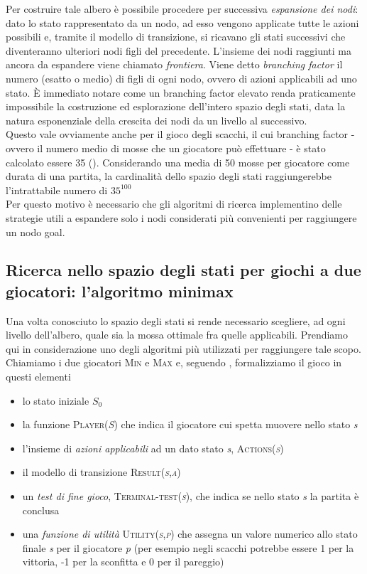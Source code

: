 Per costruire tale albero è possibile procedere per successiva \emph{espansione dei nodi}: dato lo stato rappresentato da un nodo, ad esso vengono applicate tutte le azioni possibili e, tramite il modello di transizione, si ricavano gli stati successivi che diventeranno ulteriori nodi figli del precedente.
L'insieme dei nodi raggiunti ma ancora da espandere viene chiamato \emph{frontiera}.
Viene detto \emph{branching factor} il numero (esatto o medio) di figli di ogni nodo, ovvero di azioni applicabili ad uno stato.
È immediato notare come un branching factor elevato renda praticamente impossibile la costruzione ed esplorazione dell'intero spazio degli stati, data la natura esponenziale della crescita dei nodi da un livello al successivo.\\

Questo vale ovviamente anche per il gioco degli scacchi, il cui branching factor - ovvero il numero medio di mosse che un giocatore può effettuare - è stato calcolato essere 35 (\cite{chessbf}).
Considerando una media di 50 mosse per giocatore come durata di una partita, la cardinalità dello spazio degli stati raggiungerebbe l'intrattabile numero di $ 35^{100} $ \\
Per questo motivo è necessario che gli algoritmi di ricerca implementino delle strategie utili a espandere solo i nodi considerati più convenienti per raggiungere un nodo goal.

\subsection{Ricerca nello spazio degli stati per giochi a due giocatori: l'algoritmo minimax}
Una volta conosciuto lo spazio degli stati si rende necessario scegliere, ad ogni livello dell'albero, quale sia la mossa ottimale fra quelle applicabili.
Prendiamo qui in considerazione uno degli algoritmi più utilizzati per raggiungere tale scopo.\\
Chiamiamo i due giocatori \textsc{Min} e \textsc{Max} e, seguendo \cite{randw}, formalizziamo il gioco in questi elementi
\begin{itemize}
   \item lo stato iniziale \emph{$S_0$} 
   \item la funzione \textsc{Player(\emph{S})} che indica il giocatore cui spetta muovere nello stato \emph{s}
   \item l'insieme di \emph{azioni applicabili} ad un dato stato \emph{s}, \textsc{Actions(\emph{s})}
   \item il modello di transizione \textsc{Result(\emph{s},\emph{a})}
   \item un \emph{test di fine gioco}, \textsc{Terminal-test(\emph{s})}, che indica se nello stato  \emph{s} la partita è conclusa
   \item una \emph{funzione di utilità} \textsc{Utility(\emph{s},\emph{p})} che assegna un valore numerico allo stato finale \emph{s} per il giocatore \emph{p} (per esempio negli scacchi potrebbe essere 1 per la vittoria, -1 per la sconfitta e 0 per il pareggio)
\end{itemize}

